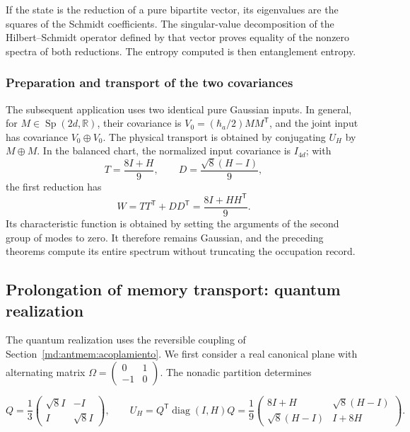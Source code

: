 If the state is the reduction of a pure bipartite vector, its
eigenvalues are the squares of the Schmidt coefficients.
The singular-value decomposition of the Hilbert--Schmidt operator defined
by that vector proves equality of the nonzero spectra of both
reductions. The entropy computed is then entanglement entropy.

\subsubsection{Preparation and transport of the two covariances}
The subsequent application uses two identical pure Gaussian inputs.
In general, for \(M\in\operatorname{Sp}(2d,\mathbb R)\), their covariance is
\(V_0=(\hbar_a/2)MM^{\mathsf T}\), and the joint input has
covariance \(V_0\oplus V_0\). The physical transport is obtained by
conjugating \(U_H\) by \(M\oplus M\). In the balanced chart,
the normalized input covariance is \(I_{4d}\); with
\[
 T=\frac{8I+H}{9},\qquad D=\frac{\sqrt8(H-I)}9,
\]
the first reduction has
\[
 W=TT^{\mathsf T}+DD^{\mathsf T}=\frac{8I+HH^{\mathsf T}}9.
\]
Its characteristic function is obtained by setting the arguments of the
second group of modes to zero. It therefore remains Gaussian, and the preceding
theorems compute its entire spectrum without truncating the occupation record.

\subsection{Prolongation of memory transport: quantum realization}

The quantum realization uses the reversible coupling of Section~\ref{md:antmem:acoplamiento}. We first consider a real canonical plane with alternating matrix \(\Omega=\left(\begin{smallmatrix}0&1\\-1&0\end{smallmatrix}\right)\). The nonadic partition determines

\begin{equation}
Q=\frac13\begin{pmatrix}\sqrt8 I&-I\\I&\sqrt8 I\end{pmatrix},\qquad
U_H=Q^{\mathsf T}\operatorname{diag}(I,H)Q
=\frac19\begin{pmatrix}8I+H&\sqrt8(H-I)\\
\sqrt8(H-I)&I+8H\end{pmatrix}.
\label{md:antmem:cuantica:eq:5.1}
\end{equation}

